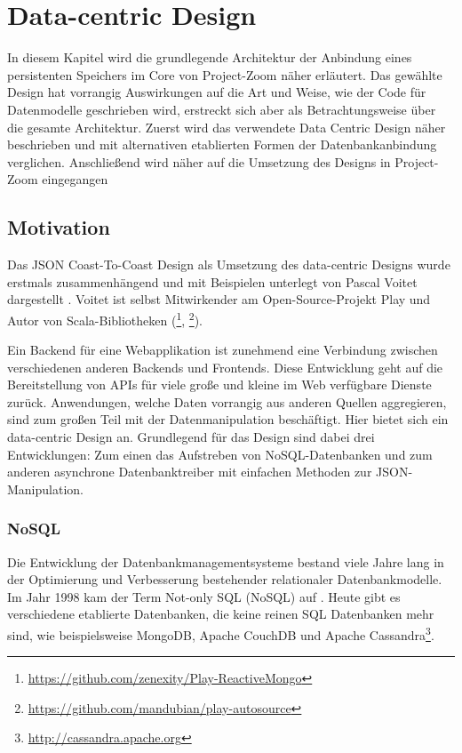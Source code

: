 \chapter{Data-centric Design}
\label{sec:dcd}
In diesem Kapitel wird die grundlegende Architektur der Anbindung eines persistenten Speichers im Core von Project-Zoom näher erläutert. Das gewählte Design hat vorrangig Auswirkungen auf die Art und Weise, wie der Code für Datenmodelle geschrieben wird, erstreckt sich aber als Betrachtungsweise über die gesamte Architektur. Zuerst wird das verwendete Data Centric Design näher beschrieben und mit alternativen etablierten Formen der Datenbankanbindung verglichen. Anschließend wird näher auf die Umsetzung des Designs in Project-Zoom eingegangen

\section{Motivation}
\label{sec:dcdmotivation}
Das JSON Coast-To-Coast Design als Umsetzung des data-centric Designs wurde erstmals zusammenhängend und mit Beispielen unterlegt von Pascal Voitet dargestellt \cite{jctc}. Voitet ist selbst Mitwirkender am Open-Source-Projekt Play und Autor von Scala-Bibliotheken (\footnote{\url{ https://github.com/zenexity/Play-ReactiveMongo}}, \footnote{\url{ https://github.com/mandubian/play-autosource}}). 

Ein Backend für eine Webapplikation ist zunehmend eine Verbindung zwischen verschiedenen anderen Backends und Frontends. Diese Entwicklung geht auf die Bereitstellung von APIs für viele große und kleine im Web verfügbare Dienste zurück. Anwendungen, welche Daten vorrangig aus anderen Quellen aggregieren, sind zum großen Teil mit der Datenmanipulation beschäftigt. Hier bietet sich ein data-centric Design an. Grundlegend für das Design sind dabei drei Entwicklungen: Zum einen das Aufstreben von NoSQL-Datenbanken und zum anderen asynchrone Datenbanktreiber mit einfachen Methoden zur JSON-Manipulation.

\subsection{NoSQL}
Die Entwicklung der Datenbankmanagementsysteme bestand viele Jahre lang in der Optimierung und Verbesserung bestehender relationaler Datenbankmodelle. Im Jahr 1998 kam der Term Not-only SQL (NoSQL) auf \cite{storage-solutions}. Heute gibt es verschiedene etablierte Datenbanken, die keine reinen SQL Datenbanken mehr sind, wie beispielsweise MongoDB, Apache CouchDB und Apache Cassandra\footnote{\url{http://cassandra.apache.org}}.

